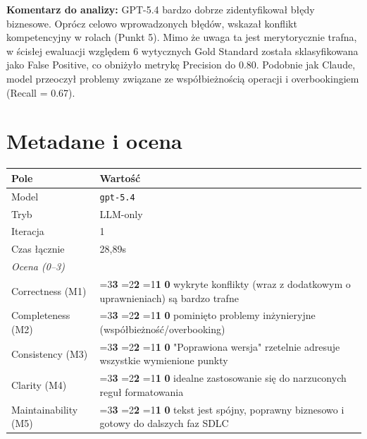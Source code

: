 \documentclass[12pt,a4paper]{article}
\newcommand{\scorebox}[1]{%
  \ifnum#1=3\colorbox{score3}{\textbf{3}}%
  \else\ifnum#1=2\colorbox{score2}{\textbf{2}}%
  \else\ifnum#1=1\colorbox{score1}{\textbf{1}}%
  \else\colorbox{score0}{\textbf{0}}\fi\fi\fi
}
\begin{document}
\vspace{0.5em}
\begin{mdframed}[backgroundcolor=metabg, linewidth=0pt, innerleftmargin=10pt, innerrightmargin=10pt, innertopmargin=6pt, innerbottommargin=6pt]
\small\textbf{Komentarz do analizy:} GPT-5.4 bardzo dobrze zidentyfikował błędy biznesowe. Oprócz celowo wprowadzonych błędów, wskazał konflikt kompetencyjny w rolach (Punkt 5). Mimo że uwaga ta jest merytorycznie trafna, w ścisłej ewaluacji względem 6 wytycznych Gold Standard została sklasyfikowana jako False Positive, co obniżyło metrykę Precision do 0.80. Podobnie jak Claude, model przeoczył problemy związane ze współbieżnością operacji i overbookingiem (Recall = 0.67).
\end{mdframed}

\section{Metadane i ocena}
\begin{table}[h]
\begin{tabularx}{\textwidth}{l X}
\toprule
\textbf{Pole} & \textbf{Wartość} \\
\midrule
Model & \texttt{gpt-5.4} \\
Tryb & LLM-only \\
Iteracja & 1 \\
Czas łącznie & 28,89s \\
\midrule
\multicolumn{2}{l}{\textit{Ocena (0--3)}} \\
\midrule
Correctness (M1)     & \scorebox{3} \quad wykryte konflikty (wraz z dodatkowym o uprawnieniach) są bardzo trafne \\
Completeness (M2)    & \scorebox{2} \quad pominięto problemy inżynieryjne (współbieżność/overbooking) \\
Consistency (M3)     & \scorebox{3} \quad "Poprawiona wersja" rzetelnie adresuje wszystkie wymienione punkty \\
Clarity (M4)         & \scorebox{3} \quad idealne zastosowanie się do narzuconych reguł formatowania \\
Maintainability (M5) & \scorebox{3} \quad tekst jest spójny, poprawny biznesowo i gotowy do dalszych faz SDLC \\
\bottomrule
\end{tabularx}
\end{table}
\end{document}
